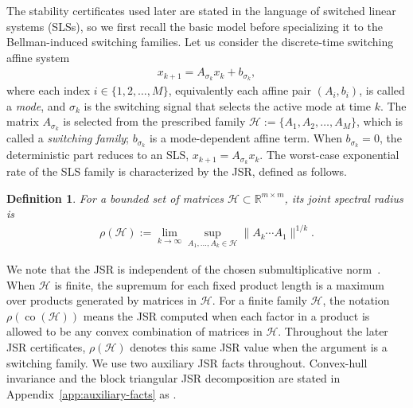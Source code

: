 \documentclass[letterpaper]{article}
\numberwithin{equation}{section}
\newtheorem{definition}{Definition}[section]
\newcommand{\R}{\mathbb{R}}
\newcommand{\jsr}{\rho}
\newcommand{\co}{\operatorname{co}}
\begin{document}
The stability certificates used later are stated in the language of switched linear systems (SLSs), so we first recall the basic model before specializing it to the
Bellman-induced switching families. Let us consider the discrete-time switching
affine system~\citep{liberzon2003switching,lin2009stability,shorten2007stability}
\begin{align*}
  x_{k+1}=A_{\sigma_k}x_k+b_{\sigma_k},
\end{align*}
where each index $i\in\{1,2,\ldots,M\}$, equivalently each affine pair
$(A_i,b_i)$, is called a \emph{mode}, and $\sigma_k$ is the switching signal that
selects the active mode at time $k$. The matrix $A_{\sigma_k}$ is selected from
the prescribed family $\mathcal H:=\{A_1,A_2,\ldots,A_M\}$, which is called a
\emph{switching family}; $b_{\sigma_k}$ is a mode-dependent affine term. When
$b_{\sigma_k}=0$, the deterministic part reduces to an SLS, $x_{k+1}=A_{\sigma_k}x_k$. The worst-case exponential rate of the SLS
family is characterized by the JSR, defined as follows.
\begin{definition}
\label{def:jsr}
For a bounded set of matrices $\mathcal H\subset\R^{m\times m}$, its joint
spectral radius is
\begin{align*}
\jsr(\mathcal H)
:=
\lim_{k\to\infty}
\sup_{A_1,\ldots,A_k\in\mathcal H}
\|A_k\cdots A_1\|^{1/k}.
\end{align*}
\end{definition}
We note that the JSR is independent of the chosen submultiplicative
norm~\citep{rota1960note,jungers2009joint}. When $\mathcal H$ is finite, the
supremum for each fixed product length is a maximum over products generated by
matrices in $\mathcal H$. For a finite family $\mathcal H$, the notation
$\jsr(\co(\mathcal H))$ means the JSR computed when each factor in a product is
allowed to be any convex combination of matrices in $\mathcal H$.
Throughout the later JSR certificates, $\rho(\mathcal H)$ denotes this same JSR
value when the argument is a switching family.
We use two auxiliary JSR facts throughout. Convex-hull invariance and the block
triangular JSR decomposition are stated in Appendix~\ref{app:auxiliary-facts} as
.
\end{document}
